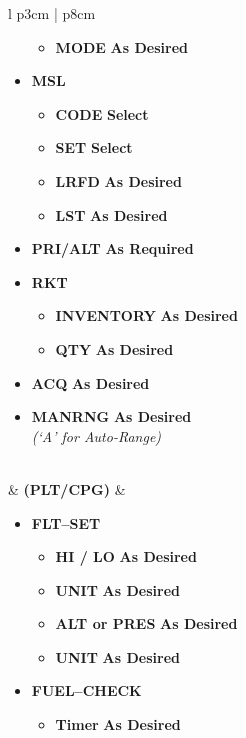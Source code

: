 \documentclass[fontHelvetica]{TechCheck}
\begin{document}
\begin{center}
\begin{longtable}{l p{3cm} | p{8cm}}
\begin{minipage}[t]{\linewidth}
\begin{itemize}
\begin{itemize}
						\item \textbf{MODE} \dotfill \textbf{As Desired}
					\end{itemize}
					\item \textbf{MSL}
					\begin{itemize}
						\item \textbf{CODE} \dotfill \textbf{Select}
						\item \textbf{SET} \dotfill \textbf{Select}
						\item \textbf{LRFD} \dotfill \textbf{As Desired}
						\item \textbf{LST} \dotfill \textbf{As Desired}
					\end{itemize}
					\item \textbf{PRI/ALT} \dotfill \textbf{As Required}
					\item \textbf{RKT}
					\begin{itemize}
						\item \textbf{INVENTORY} \dotfill \textbf{As Desired}
						\item \textbf{QTY} \dotfill \textbf{As Desired}
					\end{itemize}
					\item \textbf{ACQ} \dotfill \textbf{As Desired}
					\item \textbf{MANRNG} \dotfill \textbf{As Desired} \\
					\hfill \emph{(`A' for Auto-Range)}
				\end{itemize}
			\end{minipage} \\
			\midrule
			\textbf{\textbullet} &  \textbf{(PLT/CPG)} &
			\begin{minipage}[t]{\linewidth}
				\begin{itemize}
					\item \textbf{FLT--SET}
					\begin{itemize}
						\item \textbf{HI / LO} \dotfill \textbf{As Desired}
						\item \textbf{UNIT} \dotfill \textbf{As Desired}
						\item \textbf{ALT or PRES} \dotfill \textbf{As Desired}
						\item \textbf{UNIT} \dotfill \textbf{As Desired}
					\end{itemize}
					\item \textbf{FUEL--CHECK}
					\begin{itemize}
						\item \textbf{Timer} \dotfill \textbf{As Desired}

\end{itemize}
\end{itemize}
\end{minipage}
\end{longtable}
\end{center}
\end{document}
